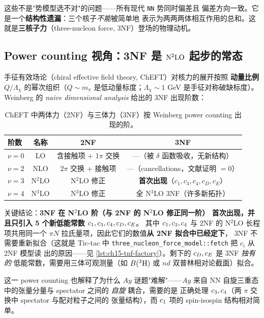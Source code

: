 这些不是"势模型选不对"的问题——所有现代 \texttt{NN} 势同时偏差且
偏差方向一致。它是一个\textbf{结构性遗漏}：三个核子\emph{不能}被简单地
表示为两两两体相互作用的总和。这就是\textbf{三核子力}（three-nucleon force,
3NF）登场的物理动机。

\subsection{Power counting 视角：3NF 是 \({\rm N}^2{\rm LO}\) 起步的常态}
\label{subsec:ch15-power-counting}

手征有效场论（chiral effective field theory, ChEFT）对核力的展开按照
\textbf{动量比例 \(Q/\Lambda_\chi\)} 的幂次组织（\(Q \sim m_\pi\)
是低动量标度；\(\Lambda_\chi \sim 1\) GeV 是手征对称破缺标度）。
Weinberg 的 \emph{naive dimensional analysis} 给出的 3NF 出现阶数：

\begin{table}[h]
\centering
\caption{ChEFT 中两体力（2NF）与三体力（3NF）按 Weinberg power counting 出现的阶。}
\label{tab:ch15-power-counting}
\begin{tabular}{l c c c}
\toprule
阶数 & 名称 & 2NF & 3NF \\
\midrule
\(\nu = 0\) & LO     & 含接触项 + 1\(\pi\) 交换 & ---（被 \(\delta\) 函数吸收，无新结构）\\
\(\nu = 2\) & NLO    & 2\(\pi\) 交换 + 接触项   & ---（cancellations，文献证明 \(=0\)）\\
\(\nu = 3\) & N\({}^2\)LO & N\(^2\)LO 修正 & \textbf{首次出现}（\(c_1, c_3, c_4, c_D, c_E\)）\\
\(\nu = 4\) & N\({}^3\)LO & N\(^3\)LO 修正 & 全 N\(^3\)LO 3NF（许多新拓扑）\\
\bottomrule
\end{tabular}
\end{table}

关键结论：\textbf{3NF 在 N\(^2\)LO 阶（与 2NF 的 N\(^2\)LO 修正同一阶）
首次出现，并且只引入 5 个新低能常数 \(c_1, c_3, c_4, c_D, c_E\)}。
其中 \(c_1, c_3, c_4\) 与 2NF 的 N\(^2\)LO 长程项共用同一个
\(\pi N\) 拉氏量项，因此它们的数值\textbf{从 2NF 拟合中已经定下}，
3NF 不需要重新拟合（这就是 Tic-tac 中
\texttt{three\_nucleon\_force\_model::fetch} 把 \(c_i\) 从 2NF 模型读
出的原因——见 \cref{lst:ch15-tnf-factory}）。剩下的 \(c_D, c_E\) 是
3NF \emph{独有的} 低能常数，需要用三体可观测量（如 \(B(^3{\rm H})\) 或
\(nd\) 双普林相对论截面）拟合。

这一 power counting 也解释了为什么 \(Ay\) 谜题"难解"——\(Ay\) 来自
NN 自旋三重态中的张量分量与 spectator 之间的 \emph{自旋} 耦合，需要的是
正确处理 \(c_3, c_4\)（两 \(\pi\) 交换中 spectator 与配对粒子之间的
张量结构），而 \(c_1\) 项的 spin-isospin 结构相对简单。

